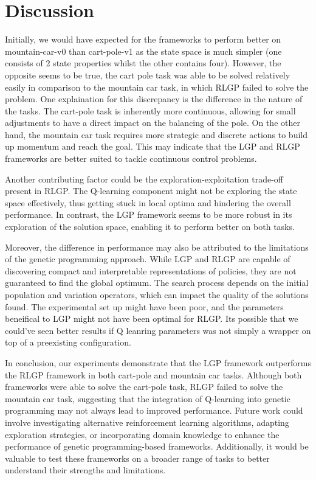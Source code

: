 \documentclass[12pt, final]{dalcsthesis}
\begin{document}
\section{Discussion}

Initially, we would have expected for the frameworks to perform better on mountain-car-v0 than cart-pole-v1 as the state space is much simpler (one consists of 2 state properties whilst the other contains four). However, the opposite seems to be true,
the cart pole task was able to be solved relatively easily in comparison to the mountain car task, in which RLGP failed to solve the problem. One explaination for this discrepancy is the difference in the nature of the tasks. The cart-pole task is inherently more continuous, allowing for small adjustments to have a direct impact on the balancing of the pole. On the other hand, the mountain car task requires more strategic and discrete actions to build up momentum and reach the goal. This may indicate that the LGP and RLGP frameworks are better suited to tackle continuous control problems.

Another contributing factor could be the exploration-exploitation trade-off present in RLGP. The Q-learning component might not be exploring the state space effectively, thus getting stuck in local optima and hindering the overall performance. In contrast, the LGP framework seems to be more robust in its exploration of the solution space, enabling it to perform better on both tasks.

Moreover, the difference in performance may also be attributed to the limitations of the genetic programming approach. While LGP and RLGP are capable of discovering compact and interpretable representations of policies, they are not guaranteed to find the global optimum. The search process depends on the initial population and variation operators, which can impact the quality of the solutions found. The experimental set up might have been poor, and the parameters beneifical to LGP might not have been optimal for RLGP. Its possible that
we could've seen better results if Q leanring parameters was not simply a wrapper on top of a preexisting configuration.

In conclusion, our experiments demonstrate that the LGP framework outperforms the RLGP framework in both cart-pole and mountain car tasks. Although both frameworks were able to solve the cart-pole task, RLGP failed to solve the mountain car task, suggesting that the integration of Q-learning into genetic programming may not always lead to improved performance. Future work could involve investigating alternative reinforcement learning algorithms, adapting exploration strategies, or incorporating domain knowledge to enhance the performance of genetic programming-based frameworks. Additionally, it would be valuable to test these frameworks on a broader range of tasks to better understand their strengths and limitations.
\end{document}
